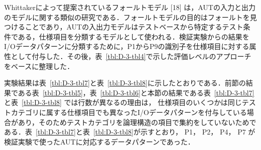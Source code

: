 \documentclass[a4paper,12pt]{jreport}
\begin{document}
  Whittakerによって提案されているフォールトモデル [18] は，AUTの入力と出力のモデルに関する類似の研究である．フォールトモデルの目的はフォールトを見つけることであり，AUTの入出力モデルはテストベースから特定するテスト条件である，仕様項目を分類するモデルとして使われる．検証実験からの結果をI/Oデータパターンに分類するために，P1からP9の識別子を仕様項目に対する属性として付与した．その後，表~\ref{tbl:D-3-tbl4}で示した評価レベルのアプローチをベースに整理した．

  実験結果は表~\ref{tbl:D-3-tbl7}と表~\ref{tbl:D-3-tbl8}に示したとおりである．前節の結果である表~\ref{tbl:D-3-tbl5}，表~\ref{tbl:D-3-tbl6}と本節の結果である表~\ref{tbl:D-3-tbl7}と表~\ref{tbl:D-3-tbl8} では行数が異なるの理由は， 仕様項目のいくつかは同じテストカテゴリに属する仕様項目でも異なったI/Oデータパターンを付与している場合があり，そのためテストカテゴリを論理構造の項目で集約をしていないためである．表~\ref{tbl:D-3-tbl7}と表~\ref{tbl:D-3-tbl8}が示すとおり， P1， P2， P4， P7 が検証実験で使ったAUTに対応するデータパターンであった．
\end{document}
